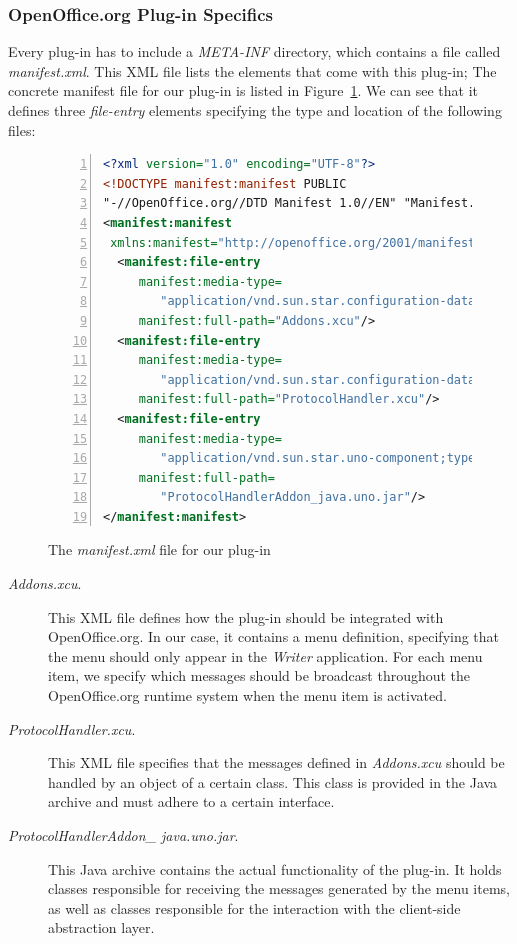 \subsubsection{OpenOffice.org Plug-in Specifics}
Every plug-in has to include a
\emph{META-INF} directory, which contains a file called
\emph{manifest.xml}. This XML file lists the elements that come with
this plug-in;  The concrete manifest file for our plug-in is listed in
Figure~\ref{list:manifest}.  We can see that it defines three
\emph{file-entry} elements specifying the type and location of the
following files:
\begin{figure}[tb]
\centering
\begin{lstlisting}[language=XML,numbers=left,xleftmargin=8mm,columns=flexible]
<?xml version="1.0" encoding="UTF-8"?> 
<!DOCTYPE manifest:manifest PUBLIC 
"-//OpenOffice.org//DTD Manifest 1.0//EN" "Manifest.dtd"> 
<manifest:manifest 
 xmlns:manifest="http://openoffice.org/2001/manifest"> 
  <manifest:file-entry 
     manifest:media-type=
        "application/vnd.sun.star.configuration-data" 
     manifest:full-path="Addons.xcu"/> 
  <manifest:file-entry 
     manifest:media-type=
        "application/vnd.sun.star.configuration-data" 
     manifest:full-path="ProtocolHandler.xcu"/> 
  <manifest:file-entry 
     manifest:media-type=
        "application/vnd.sun.star.uno-component;type=Java" 
     manifest:full-path=
        "ProtocolHandlerAddon_java.uno.jar"/>
</manifest:manifest> 
\end{lstlisting}
\caption{The \emph{manifest.xml} file for our plug-in}
\label{list:manifest}
\end{figure}


\begin{description}
\item[\emph{Addons.xcu}.] This XML file defines how the plug-in should
  be integrated with OpenOffice.org. In our case, it contains a menu
  definition, specifying that the menu should only appear in the
  \emph{Writer} application. For each menu item, we specify which
  messages should be broadcast throughout the OpenOffice.org runtime
  system when the menu item is activated.
\item[\emph{ProtocolHandler.xcu}. ] This XML file specifies that the
  messages defined in \emph{Addons.xcu} should be handled by an object
  of a certain class. This class is provided in the Java archive and
  must adhere to a certain interface. 
\item[\emph{ProtocolHandlerAddon\_ java.uno.jar}.] This Java archive
  contains the actual functionality of the plug-in. It holds classes
  responsible for receiving the messages generated by the menu items,
  as well as classes responsible for the interaction with the
  client-side abstraction layer.
\end{description}


